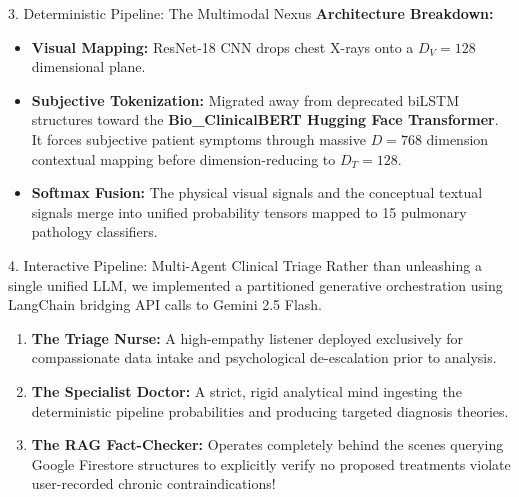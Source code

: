 \documentclass[aspectratio=169, 10pt]{beamer}
\begin{document}
\begin{frame}{3. Deterministic Pipeline: The Multimodal Nexus}
    \textbf{Architecture Breakdown:}
    \begin{itemize}
        \item \textbf{Visual Mapping:} ResNet-18 CNN drops chest X-rays onto a $D_V=128$ dimensional plane.
        \item \textbf{Subjective Tokenization:} Migrated away from deprecated biLSTM structures toward the \textbf{Bio\_ClinicalBERT Hugging Face Transformer}. It forces subjective patient symptoms through massive $D=768$ dimension contextual mapping before dimension-reducing to $D_T=128$.
        \item \textbf{Softmax Fusion:} The physical visual signals and the conceptual textual signals merge into unified probability tensors mapped to 15 pulmonary pathology classifiers.
    \end{itemize}
\end{frame}

\begin{frame}{4. Interactive Pipeline: Multi-Agent Clinical Triage}
    Rather than unleashing a single unified LLM, we implemented a partitioned generative orchestration using LangChain bridging API calls to Gemini 2.5 Flash.
    \vspace{0.3cm}
    \begin{enumerate}
        \item \textbf{The Triage Nurse:} A high-empathy listener deployed exclusively for compassionate data intake and psychological de-escalation prior to analysis.
        \item \textbf{The Specialist Doctor:} A strict, rigid analytical mind ingesting the deterministic pipeline probabilities and producing targeted diagnosis theories.
        \item \textbf{The RAG Fact-Checker:} Operates completely behind the scenes querying Google Firestore structures to explicitly verify no proposed treatments violate user-recorded chronic contraindications!
    \end{enumerate}
\end{frame}
\end{document}
